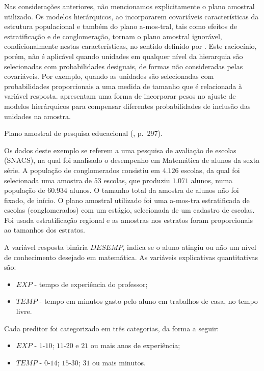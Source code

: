 \documentclass[]{book}
\numberwithin{example}{chapter}
\numberwithin{remark}{chapter}
\numberwithin{definition}{chapter}
\let\BeginKnitrBlock\begin \let\EndKnitrBlock\end
\begin{document}
Nas considerações anteriores, não mencionamos explicitamente o plano
amostral utilizado. Os modelos hierárquicos, ao incorporarem covariáveis
características da estrutura populacional e também do plano a-mos-tral,
tais como efeitos de estratificação e de conglomeração, tornam o plano
amostral ignorável, condicionalmente nestas características, no sentido
definido por \citep{Rubin76}. Este raciocínio, porém, não é aplicável
quando unidades em qualquer nível da hierarquia são selecionadas com
probabilidades desiguais, de formas não consideradas pelas covariáveis.
Por exemplo, quando as unidades são selecionadas com probabilidades
proporcionais a uma medida de tamanho que é relacionada à variável
resposta. \citep{Pfefetalli} apresentam uma forma de incorporar pesos no
ajuste de modelos hierárquicos para compensar diferentes probabilidades
de inclusão das unidades na amostra.

\BeginKnitrBlock{example}
\protect\hypertarget{ex:unnamed-chunk-109}{}{\label{ex:unnamed-chunk-109}}Plano
amostral de pesquisa educacional (\citep{lethonen}, p.~297).
\EndKnitrBlock{example} Os dados deste exemplo se referem a uma pesquisa
de avaliação de escolas (SNACS), na qual foi analisado o desempenho em
Matemática de alunos da sexta série. A população de conglomerados
consistiu em \(4.126\) escolas, da qual foi selecionada uma amostra de
\(53\) escolas, que produziu \(1.071\) alunos, numa população de
\(60.934\) alunos. O tamanho total da amostra de alunos não foi fixado,
de início. O plano amostral utilizado foi uma a-mos-tra estratificada de
escolas (conglomerados) com um estágio, selecionada de um cadastro de
escolas. Foi usada estratificação regional e as amostras nos estratos
foram proporcionais ao tamanhos dos estratos.

A variável resposta binária \(DESEMP\), indica se o aluno atingiu ou não
um nível de conhecimento desejado em matemática. As variáveis
explicativas quantitativas são:

\begin{itemize}
\item
  \(EXP\) - tempo de experiência do professor;
\item
  \(TEMP\) - tempo em minutos gasto pelo aluno em trabalhos de casa, no
  tempo livre.
\end{itemize}

Cada preditor foi categorizado em três categorias, da forma a seguir:

\begin{itemize}
\item
  \(EXP\) - \(1\)-\(10\); \(11\)-\(20\) e \(21\) ou mais anos de
  experiência;
\item
  \(TEMP\) - \(0\)-\(14\); \(15\)-\(30\); \(31\) ou mais minutos.
\end{itemize}
\end{document}
